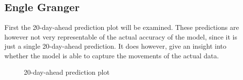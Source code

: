 \subsection{Engle Granger}\label{englegrangerforecastsection}
First the 20-day-ahead prediction plot will be examined. These predictions are however not very representable of the actual accuracy of the model, since it is just a single 20-day-ahead prediction. It does however, give an insight into whether the model is able to capture the movements of the actual data.
\begin{figure}[H]
  \centering
  \quad
  \caption{20-day-ahead prediction plot}
  \label{fig:SOL_ETH_20_DAY_plot}
\end{figure}
